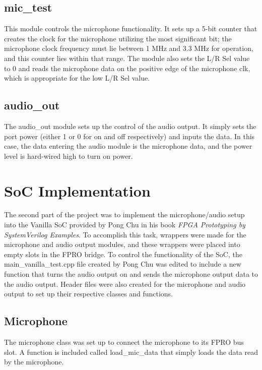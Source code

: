 \documentclass{article}
\begin{document}
\subsection{mic\_test}
This module controls the microphone functionality. It sets up a 5-bit counter that creates the clock for the microphone utilizing the most significant bit; the microphone clock frequency must lie between 1 MHz and 3.3 MHz for operation, and this counter lies within that range. The module also sets the L/R Sel value to 0 and reads the microphone data on the positive edge of the microphone clk, which is appropriate for the low L/R Sel value. 

\subsection{audio\_out}
The audio\_out module sets up the control of the audio output. It simply sets the port power (either 1 or 0 for on and off respectively) and inputs the data. In this case, the data entering the audio module is the microphone data, and the power level is hard-wired high to turn on power.

\section{SoC Implementation}
The second part of the project was to implement the microphone/audio setup into the Vanilla SoC provided by Pong Chu in his book \textit{FPGA Prototyping by SystemVerilog Examples}. To accomplish this task, wrappers were made for the microphone and audio output modules, and these wrappers were placed into empty slots in the FPRO bridge. To control the functionality of the SoC, the main\_vanilla\_test.cpp file created by Pong Chu was edited to include a new function that turns the audio output on and sends the microphone output data to the audio output. Header files were also created for the microphone and audio output to set up their respective classes and functions. 

\subsection{Microphone}
The microphone class was set up to connect the microphone to its FPRO bus slot. A function is included called load\_mic\_data that simply loads the data read by the microphone. 
\end{document}
